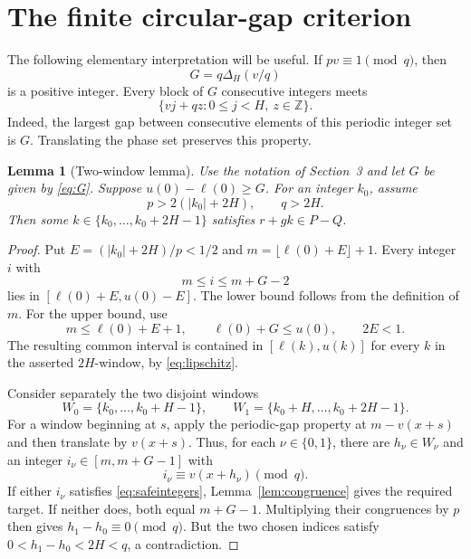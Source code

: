 \documentclass[11pt,leqno]{amsart}
\numberwithin{equation}{section}
\newtheorem{lemma}[theorem]{Lemma}
\theoremstyle{definition}
\theoremstyle{remark}
\newcommand{\Z}{\mathbb Z}
\newcommand{\gap}{\Delta}
\begin{document}
\section{The finite circular-gap criterion}

The following elementary interpretation will be useful. If $pv\equiv1\pmod q$, then
\begin{equation}\label{eq:G}
G=q\gap_H(v/q)
\end{equation}
is a positive integer. Every block of $G$ consecutive integers meets
\[
\{vj+qz:0\le j<H,\ z\in\Z\}.
\]
Indeed, the largest gap between consecutive elements of this periodic integer set is $G$. Translating the phase set preserves this property.

\begin{lemma}[Two-window lemma]\label{lem:twowindows}
Use the notation of Section~3 and let $G$ be given by \eqref{eq:G}. Suppose $u(0)-\ell(0)\ge G$. For an integer $k_0$, assume
\begin{equation}\label{eq:largepq}
p>2(|k_0|+2H),\qquad q>2H.
\end{equation}
Then some $k\in\{k_0,\ldots,k_0+2H-1\}$ satisfies $r+gk\in P-Q$.
\end{lemma}
\begin{proof}
Put $E=(|k_0|+2H)/p<1/2$ and $m=\lfloor\ell(0)+E\rfloor+1$. Every integer $i$ with
\begin{equation}\label{eq:safeintegers}
m\le i\le m+G-2
\end{equation}
lies in $[\ell(0)+E,u(0)-E]$. The lower bound follows from the definition of $m$. For the upper bound, use
\[
m\le\ell(0)+E+1,\qquad
\ell(0)+G\le u(0),\qquad 2E<1.
\]
The resulting common interval is contained in $[\ell(k),u(k)]$ for every $k$ in the asserted $2H$-window, by \eqref{eq:lipschitz}.

Consider separately the two disjoint windows
\[
W_0=\{k_0,\ldots,k_0+H-1\},\qquad
W_1=\{k_0+H,\ldots,k_0+2H-1\}.
\]
For a window beginning at $s$, apply the periodic-gap property at $m-v(x+s)$ and then translate by $v(x+s)$. Thus, for each $\nu\in\{0,1\}$, there are $h_\nu\in W_\nu$ and an integer $i_\nu\in[m,m+G-1]$ with
\[
i_\nu\equiv v(x+h_\nu)\pmod q.
\]
If either $i_\nu$ satisfies \eqref{eq:safeintegers}, Lemma~\ref{lem:congruence} gives the required target. If neither does, both equal $m+G-1$. Multiplying their congruences by $p$ then gives
$h_1-h_0\equiv0\pmod q$. But the two chosen indices satisfy $0<h_1-h_0<2H<q$, a contradiction.
\end{proof}
\end{document}
